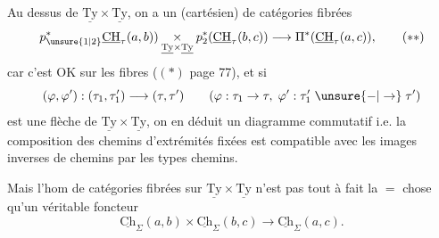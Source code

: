 Au dessus de $\underline{\mathrm{Ty}}\times \underline{\mathrm{Ty}}$, on a un  (cartésien) de catégories fibrées 
\[
p_{\unsure{1|2}}^*\underline{\mathrm{CH}}_{\tau}(a,b))\underset{\underline{\mathrm{Ty}}\times \underline{\mathrm{Ty}}}{\times}
p_2^*(\underline{\mathrm{CH}}_{\tau}(b,c))\longrightarrow\Pi^*(\underline{\mathrm{CH}}_{\tau}(a,c)),\tag*{$(**)$}
\]
car c'est OK sur les fibres ($( * )$ page 77), et si
\[
(\varphi,\varphi'):(\tau_1,\tau'_1)\longrightarrow(\tau,\tau')\qquad
(\varphi:\tau_1\to\tau,\;\varphi':\tau'_1\mathrel{\unsure{-|\to}}\tau')
\]
est une flèche de $\underline{\mathrm{Ty}}\times\underline{\mathrm{Ty}}$, on en déduit un diagramme commutatif 
i.e. la composition des chemins  d'extrémités fixées est compatible avec les images inverses de chemins par   les types  chemins.

Mais l'hom  de catégories fibrées sur $\underline{\mathrm{Ty}}\times\underline{\mathrm{Ty}}$ n'est pas tout à fait la $=$ chose qu'un véritable foncteur
\[
\underline{\mathrm{Ch}}_\Sigma(a,b)\times\underline{\mathrm{Ch}}_\Sigma(b,c)\longrightarrow\underline{\mathrm{Ch}}_\Sigma(a,c).\tag*{$(*)$}
\]

